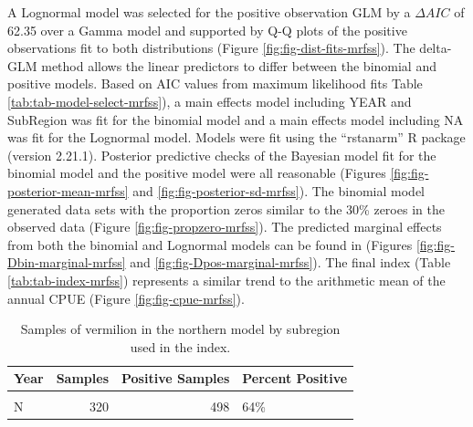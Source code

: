 \documentclass[11pt,
  english,
  a4paper,
]{article}
\begin{document}
A Lognormal model was selected for the positive observation GLM by a {\(\Delta AIC\)\leavevmode\tagmcend\tagstructend} of 62.35 over a Gamma model and supported by Q-Q plots of the positive observations fit to both distributions (Figure \ref{fig:fig-dist-fits-mrfss}). The delta-GLM method allows the linear predictors to differ between the binomial and positive models. Based on AIC values from maximum likelihood fits Table \ref{tab:tab-model-select-mrfss}), a main effects model including YEAR and SubRegion was fit for the binomial model and a main effects model including NA was fit for the Lognormal model. Models were fit using the ``rstanarm'' R package (version 2.21.1). Posterior predictive checks of the Bayesian model fit for the binomial model and the positive model were all reasonable (Figures \ref{fig:fig-posterior-mean-mrfss} and \ref{fig:fig-posterior-sd-mrfss}). The binomial model generated data sets with the proportion zeros similar to the 30\% zeroes in the observed data (Figure \ref{fig:fig-propzero-mrfss}). The predicted marginal effects from both the binomial and Lognormal models can be found in (Figures \ref{fig:fig-Dbin-marginal-mrfss} and \ref{fig:fig-Dpos-marginal-mrfss}). The final index (Table \ref{tab:tab-index-mrfss}) represents a similar trend to the arithmetic mean of the annual CPUE (Figure \ref{fig:fig-cpue-mrfss}).

\newpage

\begin{table}

\caption{\label{tab:tab-region-mrfss}Samples of vermilion in the northern model by subregion used in the index.}
\centering
\begin{tabular}[t]{lrrl}
\toprule
Year & Samples & Positive Samples & Percent Positive\\
\midrule
\cellcolor{gray!6}{C} & \cellcolor{gray!6}{442} & \cellcolor{gray!6}{585} & \cellcolor{gray!6}{76\%}\\
N & 320 & 498 & 64\%\\
\bottomrule
\end{tabular}
\end{table}
\end{document}
